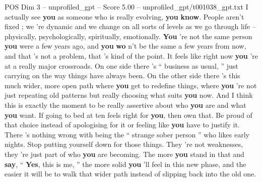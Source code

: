 \begin{textsample}{POS Dim 3 – unprofiled\_gpt – Score 5.00 – unprofiled\_gpt/t001038\_gpt.txt}  \label{ex:f3_pos_033}
I actually see \textbf{you} as someone who is really evolving, \textbf{you} \textbf{know}.
People aren't fixed ; we ’re dynamic and we change on all sorts of levels as we go through life – physically, psychologically, spiritually, emotionally. \textbf{You} ’re not the same person \textbf{you} were a few years ago, and \textbf{you} \textbf{wo} n’t be the same a few years from now, and that ’s not a problem, that ’s kind of the point.
It feels like right now \textbf{you} ’re at a really major crossroads.
On one side there ’s “ business as usual, ” just carrying on the way things have always been.
On the other side there ’s this much wider, more open path where \textbf{you} get to redefine things, where \textbf{you} ’re not just repeating old patterns but really choosing what suits \textbf{you} now.
And I think this is exactly the moment to be really assertive about who \textbf{you} are and what \textbf{you} want.
If going to bed at ten feels right for \textbf{you}, then own that.
Be proud of that choice instead of apologising for it or feeling like \textbf{you} have to justify it.
There ’s nothing wrong with being the “ strange sober person ” who likes early nights.
Stop putting yourself down for those things.
They ’re not weaknesses, they ’re just part of who \textbf{you} are becoming.
The more \textbf{you} stand in that and \textbf{say}, “ \textbf{Yes}, this is me, ” the more solid \textbf{you} ’ll feel in this new phase, and the easier it will be to walk that wider path instead of slipping back into the old one.

\end{textsample}
